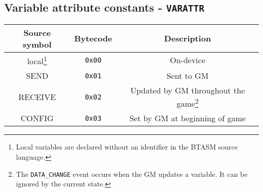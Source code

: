 \documentclass[12pt,a4paper]{scrbook}
\begin{document}
\subsection{Variable attribute constants - \texttt{VARATTR}}
\label{sec:varattrconsts}
\begin{minipage}{\linewidth}
\begin{center}
  \begin{tabular}{ | c | c || c | }
    \hline
    Source symbol & Bytecode & Description \\ \hline \hline
    local\footnote{Local variables are declared without an identifier in the 
    	BTASM source language.} & \texttt{0x00} & On-device  \\ \hline
    SEND & \texttt{0x01} & Sent to GM  \\ \hline
    RECEIVE & \texttt{0x02} & Updated by GM throughout the game\footnote{The 	
    	\texttt{DATA\_CHANGE} event occurs when the GM updates a variable.  It can be ignored by 
    	the current state.}\\ \hline
    CONFIG & \texttt{0x03} & Set by GM at beginning of game\\ \hline
  \end{tabular}
\end{center}
\end{minipage}


\end{document}
